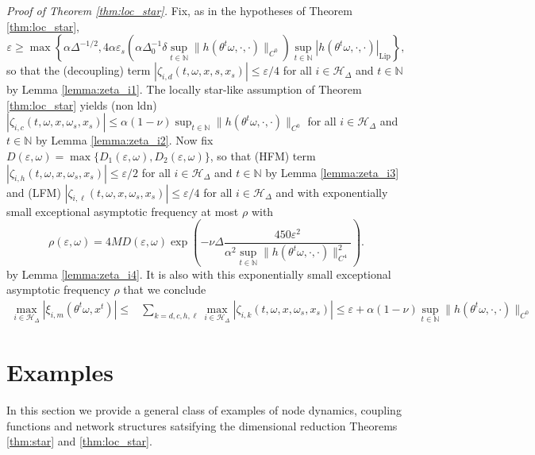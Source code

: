 \documentclass[a4paper]{article}
\theoremstyle{plain}
\theoremstyle{definition}
\newcommand{\N}{\mathbb{N}}
\newcommand{\Hil}{\mathcal{H}}
\begin{document}
\textit{Proof of Theorem \ref{thm:loc_star}.} Fix, as in the hypotheses of Theorem \ref{thm:loc_star},
$$\varepsilon\geq \max\left\{\alpha \Delta^{-1/2}, 4\alpha \varepsilon_s \left(\alpha\Delta_0^{-1} \delta\sup_{t\in\N} \|h(\theta^t\omega,\cdot,\cdot)\|_{C^0}\right)\sup_{t\in\N }|h(\theta^t\omega,\cdot,\cdot)|_{\mathrm{Lip}}\right\},
$$
so that the (decoupling) term $\left|\zeta_{i,d}(t,\omega,x,{{s}},x_{{s}})\right|\leq \varepsilon/4$ for all $i\in\Hil_{\Delta}$ and $t\in\N$  by Lemma \ref{lemma:zeta_i1}. The locally star-like assumption of Theorem \ref{thm:loc_star} yields (non ldn) 
$|\zeta_{i,c}(t,\omega,x,\omega_{{s}},x_{{s}})|\leq \alpha(1-\nu)\sup_{t\in\N} \|h(\theta^t\omega,\cdot,\cdot)\|_{C^0}$ for all $i\in\Hil_{\Delta}$ and $t\in\N$ by Lemma \ref{lemma:zeta_i2}.  Now fix $D(\varepsilon,\omega) = \max\{D_1(\varepsilon,\omega),D_2(\varepsilon,\omega)\}$, so that (HFM) term $\left|\zeta_{i,h}(t,\omega,x,\omega_{{s}},x_{{s}})\right| \leq\varepsilon/2$ for all $i\in\Hil_{\Delta}$ and $t\in\N$  by Lemma \ref{lemma:zeta_i3} and (LFM) $\left|\zeta_{i,\ell}(t,\omega,x,\omega_{{s}},x_{{s}})\right| \leq\varepsilon/4$ for all $i\in\Hil_{\Delta}$ and with exponentially small exceptional asymptotic frequency  at most $\rho$ with 
$$\rho(\varepsilon,\omega)= 4MD(\varepsilon,\omega) \exp\left(-\nu\Delta\frac{450\varepsilon^2}{\alpha^2\sup_{t\in\N }\|h(\theta^t\omega,\cdot,\cdot)\|^2_{C^4}} \right).$$
by Lemma \ref{lemma:zeta_i4}. It is also with this exponentially small exceptional asymptotic frequency $\rho$ that we conclude
\begin{align*}
	\max_{i\in\Hil_{\Delta}}\left|\xi_{i,m}(\theta^t\omega,x^t)\right| \leq& 	\sum_{k=d,c,h,\ell}	\max_{i\in\Hil_{\Delta}}\left|\zeta_{i,k}(t,\omega,x,\omega_{{s}},x_{{s}})\right|
	\leq \varepsilon + \alpha(1-\nu)\sup_{t\in\N} \|h(\theta^t\omega,\cdot,\cdot)\|_{C^0}  \tag*{\qed}
\end{align*}







\section{Examples}\label{sec:eg_contractions}
In this section we provide a general class of examples of node dynamics, coupling functions and network structures satsifying the dimensional reduction Theorems \ref{thm:star} and \ref{thm:loc_star}.
\end{document}
